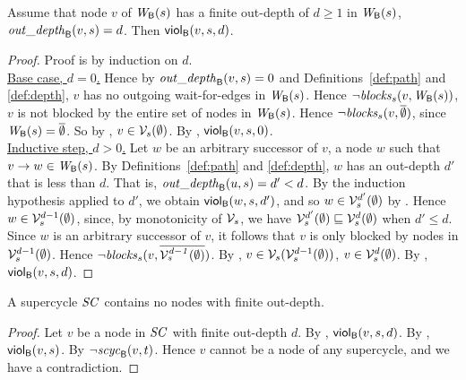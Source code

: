 \begin{proposition} \label{prop:outdepth-finite-implies-scViol}
Assume that node $v$ of $\wfg{\B}{s}$ has a finite out-depth of $d \ge 1$ in $\wfg{\B}{s}$, \ie 
$\wodepth{\B}{v}{s} = d$. Then $\viol{v}{d}{s}$.  %
\end{proposition}
%
\begin{proof}
Proof is by induction on $d$.\\

\noindent
\ul{Base case, $d=0$.} Hence by $\wodepth{\B}{v}{s} = 0$ and Definitions~\ref{def:path} and \ref{def:depth},  
$v$ has no outgoing wait-for-edges in $\wfg{\B}{s}$. Hence $\neg \blocks{s}{v}{\wfg{\B}{s}}$, \ie $v$ is not blocked by the entire set of nodes in 
$\wfg{\B}{s}$. Hence $\neg \blocks{s}{v}{\compl{\ewfg}}$, since $\wfg{\B}{s} = \compl{\ewfg}$. So by , 
$v \in \VFs{s}{\ewfg}$. By , $\scVd{v}{0}{s}$.\\


\noindent
\ul{Inductive step, $d > 0$.}
Let $w$ be an arbitrary successor of $v$, \ie a node $w$ such that $v \ar w \in \wfg{\B}{s}$.
By Definitions~\ref{def:path} and \ref{def:depth}, $w$ has an out-depth $d'$ that is less than $d$. 
That is, $\wodepth{\B}{u}{s} = d' < d$.
By the induction hypothesis applied to $d'$, we obtain $\viol{w}{d'}{s}$, and so $w \in \VFsi{s}{\ewfg}{d'}$ by .
Hence $w \in \VFsi{s}{\ewfg}{d-1}$, since, by monotonicity of $\VFsymb_s$, we have 
$ \VFsi{s}{\ewfg}{d'} \subg  \VFsi{s}{\ewfg}{d}$ when $d' \le d$.
Since  $w$ is an arbitrary successor of $v$, it follows that $v$ is only blocked by nodes in $\VFsi{s}{\ewfg}{d-1}$.
Hence $\neg \blocks{s}{v}{\compl{ \VFsi{s}{\ewfg}{d-1} } }$.
By , $v \in \VFs{s}{\VFsi{s}{\ewfg}{d-1}}$, \ie $v \in  \VFsi{s}{\ewfg}{d}$.
By , $\scVd{v}{d}{s}$.
\end{proof}








\begin{corollary} 
\label{cor:supercycle:no-finite-outdepth}
A supercycle $\SC$ contains no nodes with finite out-depth.
\end{corollary}
%
\begin{proof} 
Let $v$ be a node in $\SC$ with finite out-depth $d$.
By , $\scVd{v}{d}{s}$. %
By , $\scV{v}{s}$.
By  $\neg \scyc{\B}{t}{v}$. Hence $v$ cannot be a node of any supercycle, and we have a contradiction.
\end{proof}








